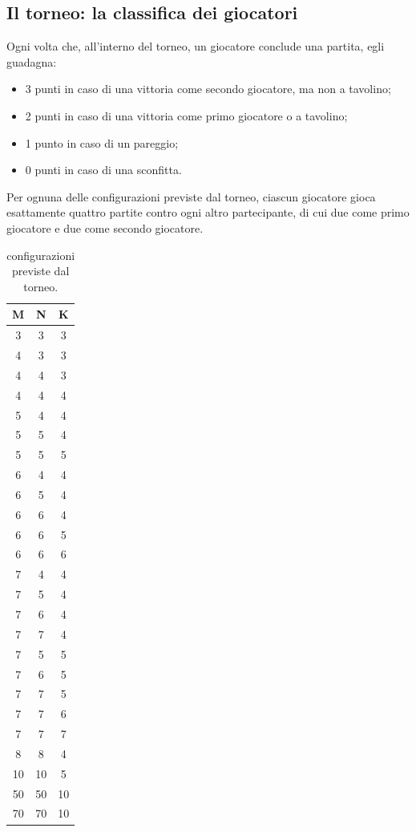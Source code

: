 \documentclass[a4paper]{article}
\begin{document}
\subsection{Il torneo: la classifica dei giocatori}

Ogni volta che, all'interno del torneo, un giocatore conclude una partita, egli
guadagna: 
\begin{itemize}
  \item 3 punti in caso di una vittoria come secondo giocatore, ma non a
    tavolino;
  \item 2 punti in caso di una vittoria come primo giocatore o a tavolino;
  \item 1 punto in caso di un pareggio;
  \item 0 punti in caso di una sconfitta.
\end{itemize}

\noindent 
Per ognuna delle configurazioni previste dal torneo, ciascun giocatore gioca
esattamente quattro partite contro ogni altro partecipante, di cui due come
primo giocatore e due come secondo giocatore.

\begin{table}[h!]
\centering
\begin{tabular}{ | c | c | c | }
  \hline
  M & N & K \\
  \hline
  3 & 3 & 3 \\
  \hline
  4 & 3 & 3 \\
  \hline
  4 & 4 & 3 \\
  \hline
  4 & 4 & 4 \\
  \hline
  5 & 4 & 4 \\
  \hline
  5 & 5 & 4 \\
  \hline
  5 & 5 & 5 \\
  \hline
  6 & 4 & 4 \\
  \hline
  6 & 5 & 4 \\
  \hline
  6 & 6 & 4 \\
  \hline
  6 & 6 & 5 \\
  \hline
  6 & 6 & 6 \\
  \hline
  7 & 4 & 4 \\
  \hline
  7 & 5 & 4 \\
  \hline
  7 & 6 & 4 \\
  \hline
  7 & 7 & 4 \\
  \hline
  7 & 5 & 5 \\
  \hline
  7 & 6 & 5 \\
  \hline
  7 & 7 & 5 \\
  \hline
  7 & 7 & 6 \\
  \hline
  7 & 7 & 7 \\
  \hline
  8 & 8 & 4 \\
  \hline
  10 & 10 & 5 \\
  \hline
  50 & 50 & 10 \\
  \hline
  70 & 70 & 10 \\
  \hline
\end{tabular}
  \caption{configurazioni previste dal torneo.}
  \label{table:1}
\end{table}
\end{document}

